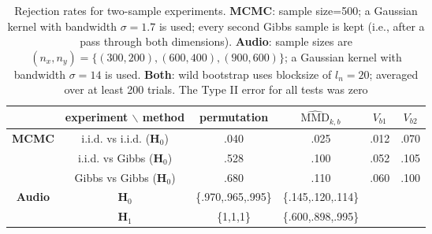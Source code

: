 \begin{table}\caption{Rejection rates for two-sample experiments. {\bf MCMC}: sample size=500; a Gaussian kernel with bandwidth
$\sigma=1.7$ is used; every second Gibbs sample is kept (i.e., after a pass
through both dimensions). {\bf Audio}: sample sizes are $(n_x,n_y)=\{(300,200),(600,400),(900,600)\}$; a Gaussian kernel with bandwidth
$\sigma=14$ is used. {\bf Both}: wild bootstrap
uses blocksize of $l_n=20$; averaged over at least 200 trials. The Type II error for all tests was zero}
\label{tab:gibbs_mmd}
\centering{}%
\begin{tabular}{|c|c|c|c|c|c|}
\cline{2-6} 
\multicolumn{1}{c|}{} & {\footnotesize experiment $\backslash$ method} & {\footnotesize permutation} & {\footnotesize $\widehat{\text{MMD}}_{k,b}$} & {\footnotesize $V_{b1}$} & {\footnotesize $V_{b2}$}\tabularnewline
\hline 
\textbf{\scriptsize MCMC} & {\footnotesize i.i.d. vs i.i.d. ($\mathbf{H}_{0}$)} & {\small .040} & {\small .025} & {\small .012}\textbf{\small{} } & {\small .070}\tabularnewline
\cline{2-6} 
 & {\footnotesize i.i.d. vs Gibbs ($\mathbf{H}_{0}$)} & {\small .528 } & {\small .100} & {\small .052} & {\small .105}\tabularnewline
\cline{2-6} 
 & {\footnotesize Gibbs vs Gibbs ($\mathbf{H}_{0}$)} & {\small .680 } & {\small .110} & {\small .060} & {\small .100}\tabularnewline
\hline 
\textbf{\scriptsize Audio} & {\footnotesize $\mathbf{H}_{0}$} & {\small \{.970,.965,.995\}} & {\small \{.145,.120,.114\}} & \multicolumn{1}{c}{} & \multicolumn{1}{c}{}\tabularnewline
\cline{2-4} 
 & {\footnotesize $\mathbf{H}_{1}$} & {\small \{1,1,1\}} & {\small \{.600,.898,.995\}} & \multicolumn{1}{c}{} & \multicolumn{1}{c}{}\tabularnewline
\cline{1-4} 
\end{tabular}
\end{table}



